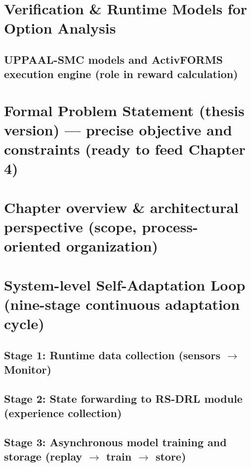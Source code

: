 \documentclass[11pt,a4paper]{article}
\begin{document}
\section{Verification \& Runtime Models for Option Analysis}
\subsection{UPPAAL-SMC models and ActivFORMS execution engine (role in reward calculation)}

\section{Formal Problem Statement (thesis version) --- precise objective and constraints (ready to feed Chapter 4)}

\newpage


\setcounter{section}{0}
\renewcommand{\thesection}{4.\arabic{section}}
\renewcommand{\thesubsection}{4.\arabic{section}.\arabic{subsection}}
\renewcommand{\thesubsubsection}{4.\arabic{section}.\arabic{subsection}.\arabic{subsubsection}}

\section{Chapter overview \& architectural perspective (scope, process-oriented organization)}

\section{System-level Self-Adaptation Loop (nine-stage continuous adaptation cycle)}
\subsection{Stage 1: Runtime data collection (sensors $\rightarrow$ Monitor)}
\subsection{Stage 2: State forwarding to RS-DRL module (experience collection)}
\subsection{Stage 3: Asynchronous model training and storage (replay $\rightarrow$ train $\rightarrow$ store)}
\end{document}
